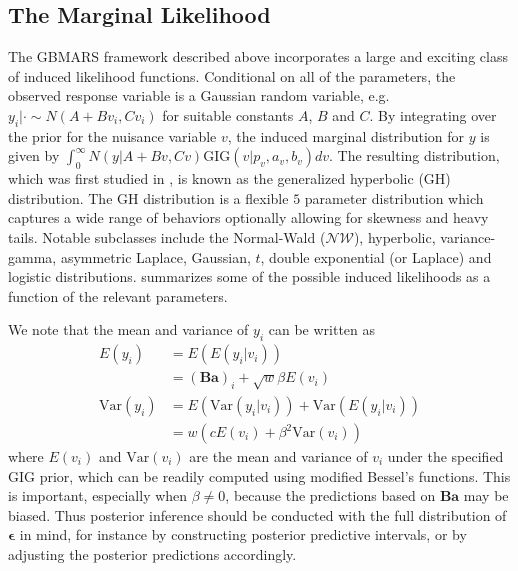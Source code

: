 \documentclass{article} %
\newcommand{\NIG}{\mathcal{NW}}
\begin{document}
\subsection{The Marginal Likelihood}
\label{sec:marginal}
The GBMARS framework described above incorporates a large and exciting class of induced likelihood functions. Conditional on all of the parameters, the observed response variable is a Gaussian random variable, e.g. $y_i|\cdot \sim N(A + Bv_i, Cv_i)$ for suitable constants $A$, $B$ and $C$. By integrating over the prior for the nuisance variable $v$, the induced marginal distribution for $y$ is given by $\int_0^\infty N(y|A+Bv,Cv)\text{GIG}(v|p_v, a_v, b_v)dv$. The resulting distribution, which was first studied in \cite{barndorff1977exponentially}, is known as the generalized hyperbolic (GH) distribution. The GH distribution is a flexible $5$ parameter distribution which captures a wide range of behaviors optionally allowing for skewness and heavy tails. Notable subclasses include the Normal-Wald ($\NIG$), hyperbolic, variance-gamma, asymmetric Laplace, Gaussian, $t$, double exponential (or Laplace) and logistic distributions.  summarizes some of the possible induced likelihoods as a function of the relevant parameters. 

We note that the mean and variance of $y_i$ can be written as
\begin{equation}
    \begin{aligned}
        E(y_i) &= E\left(E(y_i|v_i)\right) \\
        &= (\bm B \bm a)_i + \sqrt{w}\beta E(v_i) \\[1.5ex]
        \text{Var}(y_i) &= E\left( \text{Var}(y_i|v_i)\right) +  \text{Var}\left(E(y_i|v_i)\right) \\
        &= w\left(c E(v_i) + \beta^2 \text{Var}(v_i)\right)
    \end{aligned}
\end{equation}
where $E(v_i)$ and $\text{Var}(v_i)$ are the mean and variance of $v_i$ under the specified GIG prior, which can be readily computed using modified Bessel's functions. This is important, especially when $\beta \neq 0$, because the predictions based on $\bm B\bm a$ may be biased. Thus posterior inference should be conducted with the full distribution of $\bm \epsilon$ in mind, for instance by constructing posterior predictive intervals, or by adjusting the posterior predictions accordingly. 
\end{document}
